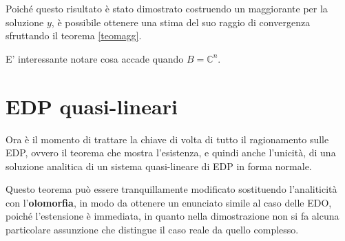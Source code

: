 Poiché questo risultato è stato dimostrato costruendo un maggiorante per la soluzione $y$, è possibile ottenere una stima del suo raggio di convergenza sfruttando il teorema \ref{teomagg}.

\begin{theorem}
\end{theorem}

\begin{remark}
E' interessante notare cosa accade quando $B=\mathbb{C}^n$.
\end{remark}




\newpage
\section{EDP quasi-lineari}

Ora è il momento di trattare la chiave di volta di tutto il ragionamento sulle EDP, ovvero il teorema che mostra l'esistenza, e quindi anche l'unicità, di una soluzione analitica di un sistema quasi-lineare di EDP in forma normale.

\begin{theorem}\label{teoquasilin}
\end{theorem}

\begin{remark}
Questo teorema può essere tranquillamente modificato sostituendo l'analiticità con l'\textbf{olomorfia}, in modo da ottenere un enunciato simile al caso delle EDO, poiché l'estensione è immediata, in quanto nella dimostrazione non si fa alcuna particolare assunzione che distingue il caso reale da quello complesso.
\end{remark}




